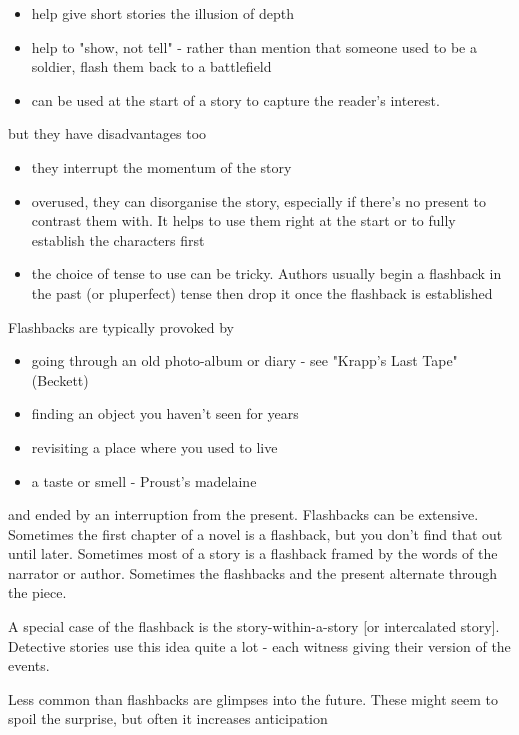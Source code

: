 \documentclass[11pt]{article}
\begin{document}
\begin{itemize}
\item  help give short stories the illusion of depth
\item  help to "show, not tell"  - rather than mention that someone used to be
a soldier, flash them back to a battlefield
\item  can be used at the start of a story to capture the reader's interest.
\end{itemize}
but they have disadvantages too
\begin{itemize}
\item  they interrupt the momentum of the story
\item  overused, they can disorganise the story, especially if there's
no present to contrast them with. It helps to use them right at the start or to fully establish the characters first
\item  the choice of tense to use can be tricky. Authors usually begin a flashback in the past (or pluperfect) tense then drop it once the flashback is established
\end{itemize} 
Flashbacks are typically provoked by


\begin{itemize}
\item  going through an old photo-album or diary - see "Krapp's Last Tape" (Beckett)
\item  finding an object you haven't seen for years
\item  revisiting a place where you used to live
\item  a taste or smell - Proust's madelaine
\end{itemize}
and ended by an interruption from the present. Flashbacks can be extensive. Sometimes the first chapter of a novel is a flashback, but you don't find that out until later. Sometimes most of a story is a flashback framed by the words of the narrator or author. Sometimes the flashbacks and the present alternate through the piece.



 
A special case of the flashback is the story-within-a-story [or intercalated story]. Detective stories use this idea quite a lot - each witness giving their version of the events.



 
Less common than flashbacks are glimpses into the future. These might seem to spoil the surprise, but often it increases anticipation
\end{document}
